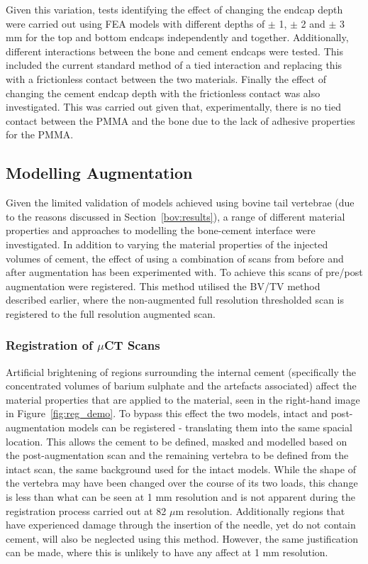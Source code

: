 Given this variation, tests identifying the effect of changing the endcap depth were carried out using FEA models with different depths of $\pm$ 1, $\pm$ 2 and $\pm$ 3 mm for the top and bottom endcaps independently and together.
Additionally, different interactions between the bone and cement endcaps were tested.
This included the current standard method of a tied interaction and replacing this with a frictionless contact between the two materials.
Finally the effect of changing the cement endcap depth with the frictionless contact was also investigated.
This was carried out given that, experimentally, there is no tied contact between the PMMA and the bone due to the lack of adhesive properties for the PMMA.



\subsection{Modelling Augmentation}

Given the limited validation of models achieved using bovine tail vertebrae (due to the reasons discussed in Section~\ref{bov:results}), a range of different material properties and approaches to modelling the bone-cement interface were investigated.
In addition to varying the material properties of the injected volumes of cement, the effect of using a combination of scans from before and after augmentation has been experimented with.
To achieve this scans of pre/post augmentation were registered.
This method utilised the BV/TV method described earlier, where the non-augmented full resolution thresholded scan is registered to the full resolution augmented scan.

\subsubsection{Registration of $\mu$CT Scans}

Artificial brightening of regions surrounding the internal cement (specifically the concentrated volumes of barium sulphate and the artefacts associated) affect the material properties that are applied to the material, seen in the right-hand image in Figure~\ref{fig:reg_demo}.
To bypass this effect the two models, intact and post-augmentation models can be registered - translating them into the same spacial location.
This allows the cement to be defined, masked and modelled based on the post-augmentation scan and the remaining vertebra to be defined from the intact scan, the same background used for the intact models.
While the shape of the vertebra may have been changed over the course of its two loads, this change is less than what can be seen at 1 mm resolution and is not apparent during the registration process carried out at 82 $\mu$m resolution.
Additionally regions that have experienced damage through the insertion of the needle, yet do not contain cement, will also be neglected using this method.
However, the same justification can be made, where this is unlikely to have any affect at 1 mm resolution.

